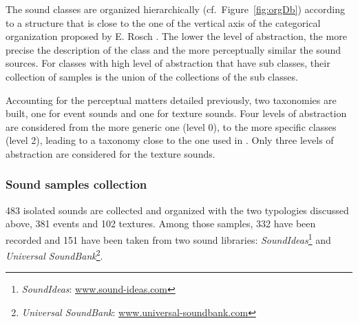 \documentclass[12pt]{elsarticle}
\newcommand{\cf}{cf.}
\begin{document}
The sound classes are organized hierarchically (\cf~Figure~\ref{fig:orgDb}) according to a structure that is close to the one of the vertical axis of the categorical organization proposed by E. Rosch \cite{rosch1978cognition}. The lower the level of abstraction, the more precise the description of the class and the more perceptually similar the sound sources. For classes with high level of abstraction that have sub classes, their collection of samples is the union of the collections of the sub classes.


Accounting for the perceptual matters detailed previously, two taxonomies are built, one for event sounds and one for texture sounds. Four levels of abstraction are considered from the more generic one (level 0), to the more specific classes (level 2), leading to a taxonomy close to the one used in \cite{Salamon14}. Only three levels of abstraction are considered for the texture sounds.

\subsubsection*{Sound samples collection}


483 isolated sounds are collected and organized with the two typologies discussed above, 381 events and 102 textures. Among those samples, 332 have been recorded and 151 have been taken from two sound libraries: \emph{SoundIdeas}\footnote{\emph{SoundIdeas}: \url{www.sound-ideas.com}} and \emph{Universal SoundBank}\footnote{\emph{Universal SoundBank}: \url{www.universal-soundbank.com}}.
\end{document}
